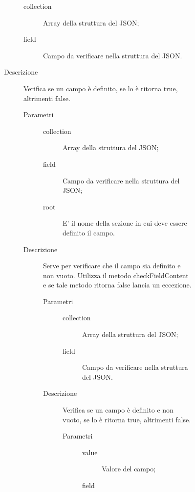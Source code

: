 \begin{description}
\begin{mldescription}
\begin{description}
\begin{description}
\begin{description}
     			\begin{description}
     				\item[collection]
     			     Array della struttura del JSON;
     			    \item[field]
     			     Campo da verificare nella struttura del JSON.
     			\end{description}
     		\item[Descrizione]
     		Verifica se un campo è definito, se lo è ritorna true, altrimenti false.
 \mlitem[checkFieldContentThrow] \hfill \\ 
 \begin{description}
     		\item[Parametri] \hfill
     			\begin{description}
     				\item[collection]
     				 Array della struttura del JSON;
     				\item[field]
     				 Campo da verificare nella struttura del JSON;
     				\item[root]
     				 E' il nome della sezione in cui deve essere definito il campo.
     			\end{description}
     		\item[Descrizione]
     		Serve per verificare che il campo sia definito e non vuoto. Utilizza il metodo checkFieldContent e se tale metodo ritorna false lancia un eccezione.
 \mlitem[checkFieldContent] \hfill \\ 
 \begin{description}
     		\item[Parametri] \hfill
     			\begin{description}
     				\item[collection]
     				 Array della struttura del JSON;
       			    \item[field]
       			     Campo da verificare nella struttura del JSON.
     			\end{description}
     		\item[Descrizione]
     		Verifica se un campo è definito e non vuoto, se lo è ritorna true, altrimenti false.
 \mlitem[IntValue] \hfill \\
 \begin{description}
     		\item[Parametri] \hfill
     			\begin{description}
     				\item[value]
     				 Valore del campo;
     				\item[field]

\end{description}
\end{description}
\end{description}
\end{description}
\end{description}
\end{description}
\end{description}
\end{mldescription}
\end{description}
